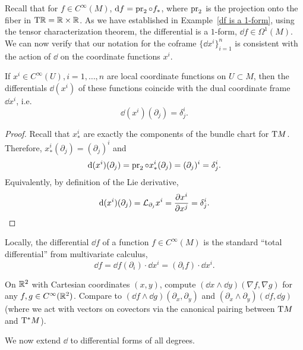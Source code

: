 Recall that for $f\in C^\infty(M)$, ${\mathrm{d}} f=\operatorname{pr}_2\circ f_\ast$, where $\operatorname{pr}_2$ is the projection onto the fiber in $\mathrm{T}\mathbb{R} =\mathbb{R} \times\mathbb{R} $. As we have established in Example~\ref{df is a 1-form}, using the tensor characterization theorem, the differential is a $1$-form, $\dd f\in\Omega^1(M)$. We can now verify that our notation for the coframe $\{\dd x^i\}_{i=1}^n$ is consistent with the action of $\dd$ on the coordinate functions $x^i$.

\begin{prop}
    If $x^i\in C^\infty(U),i=1,\ldots,n$ are local coordinate functions on $U\subset M$, then the differentials $\dd (x^i)$ of these functions coincide with the dual coordinate frame $\dd x^i$, i.e.
    \[\dd (x^i)(\partial_j)=\delta^i_j.\]
\end{prop}
\begin{proof}
    Recall that $x^i_\ast$ are exactly the components of the bundle chart for $\mathrm{T} M$. Therefore, $x^i_\ast(\partial_j)=(\partial_j)^i$ and
    \[{\mathrm{d}} (x^i)(\partial_{j})=\operatorname{pr}_2\circ x^i_\ast (\partial_{j})=(\partial_j)^i=\delta^i_j.\]
    Equivalently, by definition of the Lie derivative, 
    \[{\mathrm{d}} (x^i)(\partial_j)=\mathcal{L}_{\partial_j}x^i=\frac{\partial x^i}{\partial x^j}=\delta^i_j.\]
\end{proof}
\begin{cor}
    Locally, the differential $\dd f$ of a function $f\in C^\infty(M)$ is the standard ``total differential'' from multivariate calculus, \[\dd f=\dd f(\partial_i)\cdot\dd x^i=(\partial_i f)\cdot \dd x^i.\]
\end{cor}

\begin{xca}
    On $\mathbb{R}^2$ with Cartesian coordinates $(x,y)$, compute $(\dd x\wedge \dd y)(\nabla f,\nabla g)$ for any $f,g\in C^\infty(\mathbb{R}^2)$. Compare to $(\dd f\wedge \dd g)(\partial_x,\partial_y)$ and $(\partial_x\wedge\partial_y)(\dd f,\dd g)$ (where we act with vectors on covectors via the canonical pairing between $\mathrm{T} M$ and $\mathrm{T}^\ast M$).
\end{xca}

We now extend $\dd$ to differential forms of all degrees.

